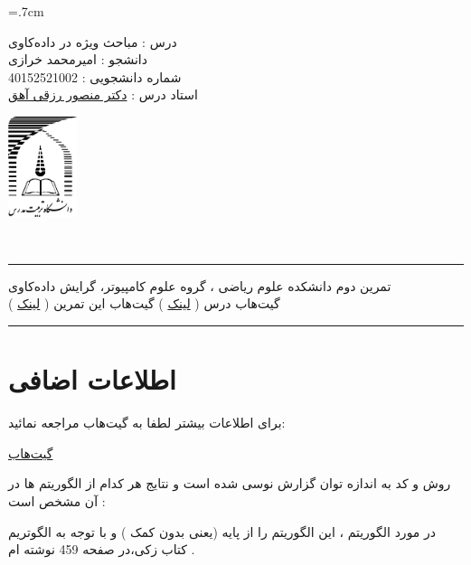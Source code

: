 \documentclass[a4paper, 12pt]{article}
\begin{document}
	
	\noindent
	\begin{minipage}[c]{5cm}
		\baselineskip=.7cm
		\begin{flushright}
			درس : مباحث ویژه در داده‌کاوی
			\\
			دانشجو :
			امیرمحمد خرازی
			\\
			شماره دانشجویی :
			40152521002 
			\\
			استاد درس :  
			\href{mrezghi.ir}{دکتر منصور رزقی آهق}
		\end{flushright}
	\end{minipage}
	\hfill
	\begin{minipage}[c]{3cm}
		\begin{center}
			\href{modares.ac.ir}{
				\includegraphics[width=2cm]{logo.png}}
		\end{center}	
	\end{minipage}
	\\[1mm]
	\hrule depth .5mm \relax
	\begin{flushright}
		تمرین دوم
		\hfill
		دانشکده علوم ریاضی ، گروه علوم کامپیوتر، گرایش داده‌کاوی
		\\
		\vspace{5mm}
		گیت‌هاب درس (
		\href{https://github.com/A-M-Kharazi/Special-Topics-in-DataMining-TMU.git}{لینک}
		)
		\hfill
		گیت‌هاب این تمرین (
		\href{}{لینک}
		)
	\end{flushright}
	
	\hrule depth .5mm\relax
	
	
	\section*{اطلاعات اضافی}
	برای اطلاعات بیشتر لطفا به گیت‌هاب  مراجعه نمائید:
	
	\begin{center}
		\href{https://github.com/A-M-Kharazi/Special-Topics-in-DataMining-TMU.git}{گیت‌هاب}
	\end{center}

	روش‌ و کد به اندازه توان گزارش نوسی شده است و نتایج هر کدام از الگوریتم ها در آن مشخص است :
	
	
	در مورد الگوریتم
	، این الگوریتم را از پایه (یعنی بدون کمک 
	)
	و با توجه به الگوتریم کتاب زکی،در صفحه 459 نوشته ام
	.
	
\end{document}
